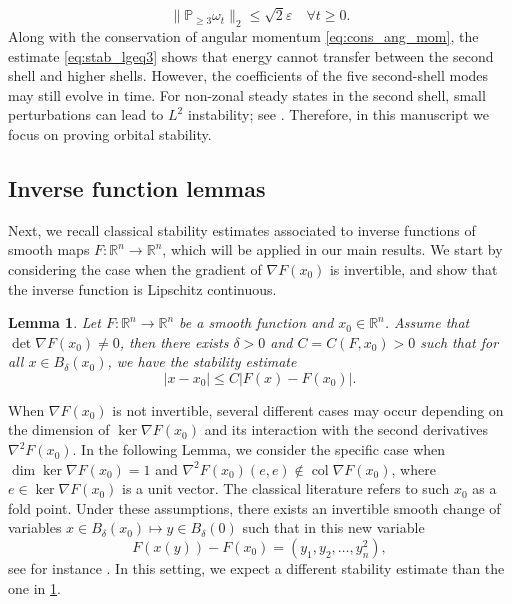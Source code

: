 \documentclass{amsart}
\newtheorem{lemma}{Lemma}[section]
\newtheorem{lemma}{Lemma}[section]  %
\def\R{{\mathbb{R}}}
\def\erre{{\mathbb{R}}}
\begin{document}
\begin{equation}
    \|\mathbb{P}_{\geq3}\omega_t\|_2\leq\sqrt{2}\varepsilon\quad\forall t\geq0.
    \label{eq:stab_lgeq3}
\end{equation}
Along with the conservation of angular momentum \eqref{eq:cons_ang_mom}, the estimate \eqref{eq:stab_lgeq3} shows that energy cannot transfer between the second shell and higher shells. However, the coefficients of the five second-shell modes may still evolve in time. For non-zonal steady states in the second shell, small perturbations can lead to $L^2$ instability; see \cite{constantin2025onsetinstabilityzonalstratospheric}. Therefore, in this manuscript we focus on proving orbital stability.

\subsection{\texorpdfstring{Inverse function lemmas}{Inverse function lemmas}} \label{subsec:calculus_lemmas}
Next, we recall classical stability estimates associated to inverse functions of smooth maps $F:\R^n\to\R^n$, which will be applied in our main results. We start by considering the case when the gradient of $\nabla F(x_0)$ is invertible, and show that the inverse function is Lipschitz continuous. 
\begin{lemma} \label{lemma:grad_neq0}
        Let $F:\erre^n \to\erre^n$ be a smooth function and $x_0\in \R^n$. Assume that $\det\nabla F(x_0)\neq0$, then there exists $\delta>0$ and $C=C(F,x_0)>0$ such that for all $x\in B_\delta(x_0)$, we have the stability estimate
        \begin{equation}\label{eq:grad_neq0}
            |x-x_0|\leq C |F(x)-F(x_0)|.
        \end{equation}
\end{lemma}
When $\nabla F(x_0)$ is not invertible, several different cases may occur depending on the dimension of $\ker\nabla F(x_0)$ and its interaction with the second derivatives $\nabla^2F(x_0)$. In the following Lemma, we consider the specific case when $\dim\ker\nabla F(x_0)=1$ and $\nabla^2F(x_0)(e,e)\notin \operatorname{col}\nabla F(x_0)$, where $e\in\ker\nabla F(x_0)$ is a unit vector. The classical literature refers to such $x_0$ as a fold point. Under these assumptions, there exists an invertible smooth change of variables $x\in B_\delta(x_0)\mapsto y\in B_\delta(0)$ such that in this new variable
    $$
        F(x(y))-F(x_0)=(y_1,y_2,\ldots,y^2_n),
    $$
see for instance \cite[Chapter III, Theorem 4.5]{golubitsky1973stable}. In this setting, we expect a different stability estimate than the one in \cref{lemma:grad_neq0}.
\end{document}
